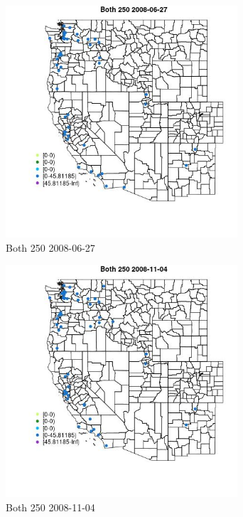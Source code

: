 \begin{figure} 
\centering  
\includegraphics[width=0.77\textwidth]{Code_Outputs/Report_ML_input_PM25_Step4_part_e_de_duplicated_aves_MapObsBoth_2502008-06-27.jpg} 
\caption{\label{fig:Report_ML_input_PM25_Step4_part_e_de_duplicated_avesMapObsBoth_2502008-06-27}Both 250 2008-06-27} 
\end{figure} 
 

\clearpage 

\begin{figure} 
\centering  
\includegraphics[width=0.77\textwidth]{Code_Outputs/Report_ML_input_PM25_Step4_part_e_de_duplicated_aves_MapObsBoth_2502008-11-04.jpg} 
\caption{\label{fig:Report_ML_input_PM25_Step4_part_e_de_duplicated_avesMapObsBoth_2502008-11-04}Both 250 2008-11-04} 
\end{figure} 
 

